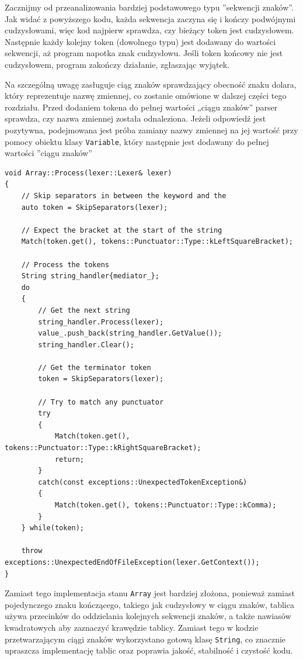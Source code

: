 Zacznijmy od przeanalizowania bardziej podstawowego typu ''sekwencji znaków''. Jak widać z powyższego kodu, każda sekwencja zaczyna się i kończy podwójnymi cudzysłowami, więc kod najpierw sprawdza, czy bieżący token jest cudzysłowem. Następnie każdy kolejny token (dowolnego typu) jest dodawany do wartości sekwencji, aż program napotka znak cudzysłowu. Jeśli token końcowy nie jest cudzysłowem, program zakończy działanie, zgłaszając wyjątek.

Na szczególną uwagę zasługuje ciąg znaków sprawdzający obecność znaku dolara, który reprezentuje nazwę zmiennej, co zostanie omówione w dalszej części tego rozdziału. Przed dodaniem tokena do pełnej wartości „ciągu znaków” parser sprawdza, czy nazwa zmiennej została odnaleziona. Jeżeli odpowiedź jest pozytywna, podejmowana jest próba zamiany nazwy zmiennej na jej wartość przy pomocy obiektu klasy \texttt{Variable}, który następnie jest dodawany do pełnej wartości ''ciągu znaków''


\begin{lstlisting}[label=list:array,caption=Metoda Array::Process(),basicstyle=\footnotesize\ttfamily]
void Array::Process(lexer::Lexer& lexer)
{
    // Skip separators in between the keyword and the
    auto token = SkipSeparators(lexer);

    // Expect the bracket at the start of the string
    Match(token.get(), tokens::Punctuator::Type::kLeftSquareBracket);

    // Process the tokens
    String string_handler{mediator_};
    do
    {
        // Get the next string
        string_handler.Process(lexer);
        value_.push_back(string_handler.GetValue());
        string_handler.Clear();

        // Get the terminator token
        token = SkipSeparators(lexer);

        // Try to match any punctuator
        try
        {
            Match(token.get(), tokens::Punctuator::Type::kRightSquareBracket);
            return;
        }
        catch(const exceptions::UnexpectedTokenException&)
        {
            Match(token.get(), tokens::Punctuator::Type::kComma);
        }
    } while(token);

    throw exceptions::UnexpectedEndOfFileException(lexer.GetContext());
}
\end{lstlisting}

Zamiast tego implementacja stanu \texttt{Array} jest bardziej złożona, ponieważ zamiast pojedynczego znaku kończącego, takiego jak cudzysłowy w ciągu znaków, tablica używa przecinków do oddzielania kolejnych sekwencji znaków, a także nawiasów kwadratowych aby zaznaczyć krawędzie tablicy. Zamiast tego w kodzie przetwarzającym ciągi znaków wykorzystano gotową klasę \texttt{String}, co znacznie upraszcza implementację tablic oraz poprawia jakość, stabilność i czystość kodu.

